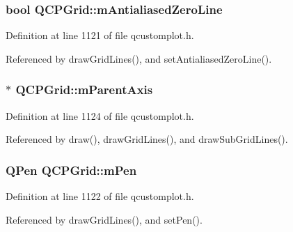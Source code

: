 \subsubsection[{m\+Antialiased\+Zero\+Line}]{\setlength{\rightskip}{0pt plus 5cm}bool Q\+C\+P\+Grid\+::m\+Antialiased\+Zero\+Line\hspace{0.3cm}{\ttfamily [protected]}}\label{class_q_c_p_grid_a8c0df56ae86440408c050895dcdb922b}


Definition at line 1121 of file qcustomplot.\+h.



Referenced by draw\+Grid\+Lines(), and set\+Antialiased\+Zero\+Line().

\hypertarget{class_q_c_p_grid_a9a8a76731e6e737b65b929fd1995cc88}{}
\subsubsection[{m\+Parent\+Axis}]{$\ast$ Q\+C\+P\+Grid\+::m\+Parent\+Axis\hspace{0.3cm}{\ttfamily [protected]}}\label{class_q_c_p_grid_a9a8a76731e6e737b65b929fd1995cc88}


Definition at line 1124 of file qcustomplot.\+h.



Referenced by draw(), draw\+Grid\+Lines(), and draw\+Sub\+Grid\+Lines().

\hypertarget{class_q_c_p_grid_a1cdc4a3bccf6a40c2d4360def9fefa40}{}
\subsubsection[{m\+Pen}]{\setlength{\rightskip}{0pt plus 5cm}Q\+Pen Q\+C\+P\+Grid\+::m\+Pen\hspace{0.3cm}{\ttfamily [protected]}}\label{class_q_c_p_grid_a1cdc4a3bccf6a40c2d4360def9fefa40}


Definition at line 1122 of file qcustomplot.\+h.



Referenced by draw\+Grid\+Lines(), and set\+Pen().

\hypertarget{class_q_c_p_grid_aa9004bc139ad3ea92629f0aaae81d83f}{}

